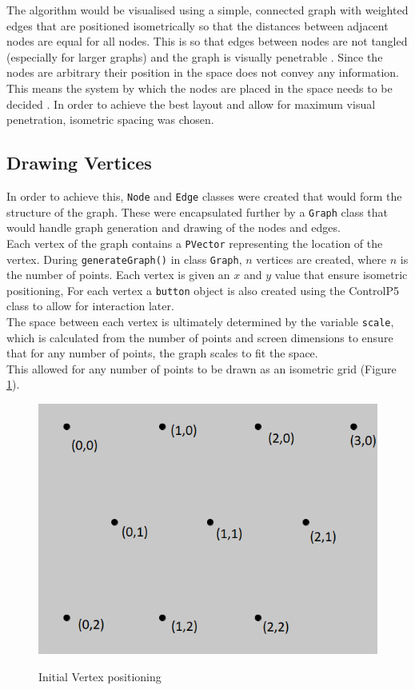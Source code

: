 \documentclass[11pt,a4paper]{article}
\begin{document}
The algorithm would be visualised using a simple, connected graph with weighted edges that are positioned
isometrically so that the distances between adjacent nodes are equal for all nodes. This is so that edges between
nodes are not tangled (especially for larger graphs) and the graph is visually penetrable \cite{card1999readings}.
Since the nodes are arbitrary
their position in the space does not convey any information. This means the system by which the nodes are placed
in the space needs to be decided \cite{mazza2009introduction}. In order to achieve the best layout
and allow for maximum visual penetration, isometric spacing was chosen.

\subsection*{Drawing Vertices}

In order to achieve this, \texttt{Node} and \texttt{Edge} classes were created that would form the structure
of the graph. These were encapsulated further by a \texttt{Graph} class that would handle graph generation and
drawing of the nodes and edges.
\\
Each vertex of the graph contains a \texttt{PVector} representing the location of the vertex. During
\texttt{generateGraph()} in class \texttt{Graph}, $n$ vertices are created, where $n$ is the number of points. Each vertex is given an $x$ and $y$ value that ensure isometric positioning,
For each vertex a \texttt{button} object is also created using the ControlP5 class to allow for interaction later.
\\
The space between each vertex is ultimately determined by the variable \texttt{scale}, which is calculated from
the number of points and screen dimensions to ensure that for any number of points, the graph scales to fit the
space.
\\
This allowed for any number of points to be drawn as an isometric grid (Figure \ref{1}).
\newpage
\begin{figure}[h]
	\centering
	\caption{Initial Vertex positioning}
	\vspace{10pt}
	\includegraphics[scale=0.5]{graph1.png}
	\label{1}
\end{figure}
\noindent
\end{document}
